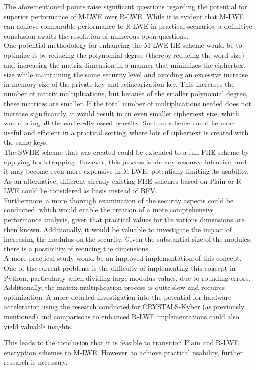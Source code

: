 The aforementioned points raise significant questions regarding the potential for superior performance of M-LWE over R-LWE. While it is evident that M-LWE can achieve comparable performance to R-LWE in practical scenarios, a definitive conclusion awaits the resolution of numerous open questions.\\
One potential methodology for enhancing the M-LWE HE scheme would be to optimize it by reducing the polynomial degree (thereby reducing the word size) and increasing the matrix dimension in a manner that minimizes the ciphertext size while maintaining the same security level and avoiding an excessive increase in memory size of the private key and relinearization key. This increases the number of matrix multiplications, but because of the smaller polynomial degree, these matrices are smaller. If the total number of multiplications needed does not increase significantly, it would result in an even smaller ciphertext size, which would bring all the earlier-discussed benefits. Such an scheme could be more useful and efficient in a practical setting, where lots of ciphertext is created with the same keys.\\
The SWHE scheme that was created could be extended to a full FHE scheme by applying bootstrapping. However, this process is already resource intensive, and it may become even more expensive in M-LWE, potentially limiting its usability. As an alternative, different already existing FHE schemes based on Plain or R-LWE could be considered as basis instead of BFV. \\
Furthermore, a more thorough examination of the security aspects could be conducted, which would enable the creation of a more comprehensive performance analysis, given that practical values for the various dimensions are then known. Additionally, it would be valuable to investigate the impact of increasing the modulus on the security. Given the substantial size of the modules, there is a possibility of reducing the dimensions.\\
A more practical study would be an improved implementation of this concept. One of the current problems is the difficulty of implementing this concept in Python, particularly when dividing large modulus values, due to rounding errors. Additionally, the matrix multiplication process is quite slow and requires optimization. A more detailed investigation into the potential for hardware acceleration using the research conducted for CRYSTALS-Kyber (as previously mentioned) and comparisons to enhanced R-LWE implementations could also yield valuable insights.

This leads to the conclusion that it is feasible to transition Plain and R-LWE encryption schemes to M-LWE. However, to achieve practical usability, further research is necessary.